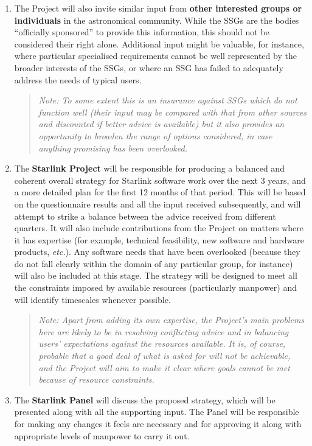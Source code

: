 \documentclass[twoside,11pt]{article}
\newcommand{\htmladdnormallink}[2]{#1}
\newcommand{\xref}[3]{#1}
\newcommand{\planref}[1]{\htmladdnormallink{#1}{http://www.starlink.ac.uk/\~{}rfws/projects/planitems.html}}
\newcommand{\st}[1]{{\em{#1}}}
\newcommand{\qt}[1]{``#1''}
\newcommand{\qt}[1]{{\tt{"}}#1{\tt{"}}}
\begin{document}
\begin{enumerate}
\item The Project will also invite similar input from {\bf other
interested groups or individuals} in the astronomical community.  While
the SSGs are the bodies \qt{officially sponsored} to provide this
information, this should not be considered their right
alone. Additional input might be valuable, for instance, where
particular specialised requirements cannot be well represented by the
broader interests of the SSGs, or where an SSG has failed to
adequately address the needs of typical users.

\begin{quote}
\st{Note: To some extent this is an insurance against SSGs which do
not function well (their input may be compared with that from other
sources and discounted if better advice is available) but it also
provides an opportunity to broaden the range of options considered, in
case anything promising has been overlooked.}
\end{quote}

\item The {\bf Starlink Project} will be responsible for producing a
balanced and coherent overall \xref{strategy}{sgp42}{} for Starlink
software work over the next 3 years, and a more detailed
\planref{plan} for the first 12 months of that period. This will be
based on the questionnaire results and all the input received
subsequently, and will attempt to strike a balance between the advice
received from different quarters. It will also include contributions
from the Project on matters where it has expertise (for example,
technical feasibility, new software and hardware products,
\st{etc.}). Any software needs that have been overlooked (because they
do not fall clearly within the domain of any particular group, for
instance) will also be included at this stage. The strategy will be
designed to meet all the constraints imposed by available resources
(particularly manpower) and will identify timescales whenever
possible.

\begin{quote}
\st{Note: Apart from adding its own expertise, the Project's main
problems here are likely to be in resolving conflicting advice and in
balancing users' expectations against the resources available. It is,
of course, probable that a good deal of what is asked for will not be
achievable, and the Project will aim to make it clear where goals
cannot be met because of resource constraints.}
\end{quote}

\item The {\bf Starlink Panel} will discuss the proposed strategy, which
will be presented along with all the supporting input. The Panel will be
responsible for making any changes it feels are necessary and for
approving it along with appropriate levels of manpower to carry it out.


\end{enumerate}
\end{document}
